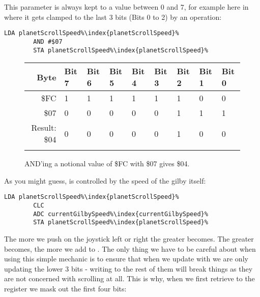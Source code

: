 This parameter is always kept to a value between 0 and 7, for example here in  where it
gets clamped to the last 3 bits (Bits 0 to 2) by an  operation:

\begin{lstlisting}[escapechar=\%]
        LDA planetScrollSpeed%\index{planetScrollSpeed}%
        AND #$07
        STA planetScrollSpeed%\index{planetScrollSpeed}%
\end{lstlisting}

\begin{figure}[H]
  {
    \setlength{\tabcolsep}{3.0pt}
    \setlength\cmidrulewidth{\heavyrulewidth} %
    \begin{adjustbox}{width=6cm,center}

      \begin{tabular}{rllllllll}
        \toprule
        Byte & Bit 7 & Bit 6 & Bit 5 & Bit 4 & Bit 3 & Bit 2 & Bit 1 & Bit 0        \\
        \midrule
        \$FC & 1 & 1 & 1 & 1 & 1 & 1 & 0 & 0 \\
        \$07 & 0 & 0 & 0 & 0 & 0 & 1 & 1 & 1 \\
        \midrule
        Result: \$04 & 0 & 0 & 0 & 0 & 0 & 1 & 0 & 0 \\
        \addlinespace
        \bottomrule
      \end{tabular}

    \end{adjustbox}

  }\caption*{AND'ing a notional value of \$FC with \$07 gives \$04.}
\end{figure}

As you might guess,  is controlled by the speed of the gilby itself:

\begin{lstlisting}[escapechar=\%]
        LDA planetScrollSpeed%\index{planetScrollSpeed}%
        CLC
        ADC currentGilbySpeed%\index{currentGilbySpeed}%
        STA planetScrollSpeed%\index{planetScrollSpeed}%
\end{lstlisting}

The more we push on the joystick left or right the greater  becomes. The
greater  becomes, the more we add to . The only
thing we have to be careful about when using this simple mechanic is to ensure that when we update
 with  we are only updating the lower 3 bits - writing to the
rest of them will break things as they are not concerned with scrolling at all. This is why, when
we first retrieve  to the  register we mask out the first four bits:

